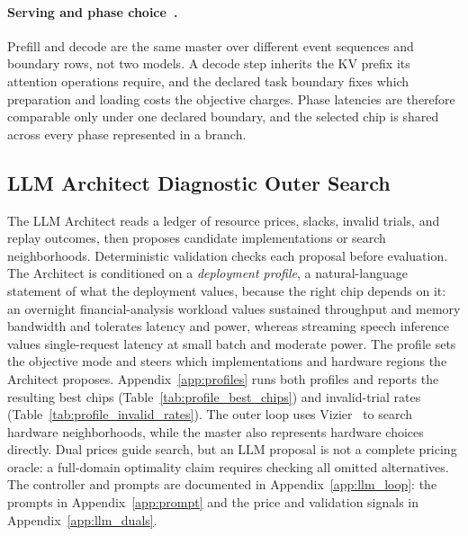 \paragraph{Serving and phase choice~.}
Prefill and decode are the same master over different event sequences and boundary rows, not two models.
A decode step inherits the KV prefix its attention operations require, and the declared task boundary fixes which preparation and loading costs the objective charges.
Phase latencies are therefore comparable only under one declared boundary, and the selected chip is shared across every phase represented in a branch.

\subsection{LLM Architect Diagnostic Outer Search}
\label{sec:llm_outer}
The LLM Architect reads a ledger of resource prices, slacks, invalid trials, and replay outcomes, then proposes candidate implementations or search neighborhoods.
Deterministic validation checks each proposal before evaluation.
The Architect is conditioned on a \emph{deployment profile}, a natural-language statement of what the deployment values, because the right chip depends on it: an overnight financial-analysis workload values sustained throughput and memory bandwidth and tolerates latency and power, whereas streaming speech inference values single-request latency at small batch and moderate power.
The profile sets the objective mode and steers which implementations and hardware regions the Architect proposes.
Appendix~\ref{app:profiles} runs both profiles and reports the resulting best chips (Table~\ref{tab:profile_best_chips}) and invalid-trial rates (Table~\ref{tab:profile_invalid_rates}).
The outer loop uses Vizier~\citep{google_vizier} to search hardware neighborhoods, while the master also represents hardware choices directly.
Dual prices guide search, but an LLM proposal is not a complete pricing oracle: a full-domain optimality claim requires checking all omitted alternatives.
The controller and prompts are documented in Appendix~\ref{app:llm_loop}: the prompts in Appendix~\ref{app:prompt} and the price and validation signals in Appendix~\ref{app:llm_duals}.
